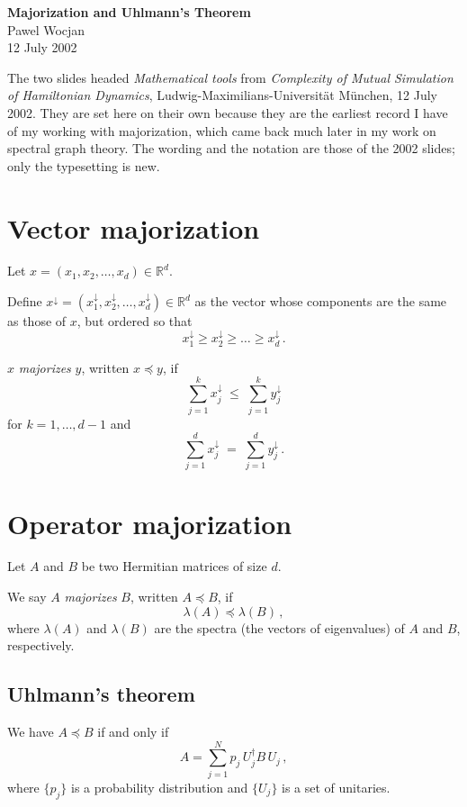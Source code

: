 \documentclass[11pt,a4paper]{article}
\begin{document}
\begin{center}
  {\Large\bfseries Majorization and Uhlmann's Theorem}\\[0.6em]
  Pawel Wocjan\\[0.2em]
  12 July 2002
\end{center}

\vspace{0.8em}

\noindent
The two slides headed \emph{Mathematical tools} from \emph{Complexity of Mutual
Simulation of Hamiltonian Dynamics}, Ludwig-Maximilians-Universität München,
12 July 2002. They are set here on their own because they are the earliest record
I have of my working with majorization, which came back much later in my work on
spectral graph theory. The wording and the notation are those of the 2002 slides;
only the typesetting is new.

\section*{Vector majorization}

Let $x=(x_1,x_2,\ldots,x_d)\in\mathbb{R}^d$.

Define
$x^\downarrow=(x^\downarrow_1,x^\downarrow_2,\ldots,x^\downarrow_d)\in\mathbb{R}^d$
as the vector whose components are the same as those of $x$, but ordered so that
\[
  x^\downarrow_1\ge x^\downarrow_2\ge\ldots\ge x^\downarrow_d\,.
\]

$x$ \emph{majorizes} $y$, written $x\preceq y$, if
\[
  \sum_{j=1}^k x^\downarrow_j \;\le\; \sum_{j=1}^k y^\downarrow_j
\]
for $k=1,\ldots,d-1$ and
\[
  \sum_{j=1}^d x^\downarrow_j \;=\; \sum_{j=1}^d y^\downarrow_j\,.
\]

\section*{Operator majorization}

Let $A$ and $B$ be two Hermitian matrices of size $d$.

We say $A$ \emph{majorizes} $B$, written $A\preceq B$, if
\[
  \lambda(A)\preceq\lambda(B)\,,
\]
where $\lambda(A)$ and $\lambda(B)$ are the spectra (the vectors of eigenvalues)
of $A$ and $B$, respectively.

\subsection*{Uhlmann's theorem}

We have $A\preceq B$ if and only if
\[
  A=\sum_{j=1}^N p_j\, U_j^\dagger B\, U_j\,,
\]
where $\{p_j\}$ is a probability distribution and $\{U_j\}$ is a set of unitaries.
\end{document}
